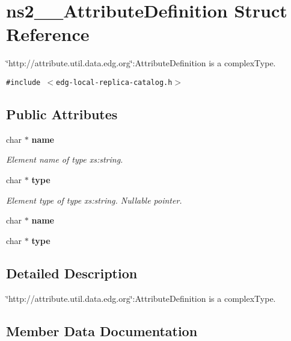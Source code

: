 \section{ns2\_\-\_\-Attribute\-Definition Struct Reference}
\label{structns2____AttributeDefinition}
\char`\"{}http://attribute.util.data.edg.org\char`\"{}:Attribute\-Definition is a complex\-Type.  


{\tt \#include $<$edg-local-replica-catalog.h$>$}

\subsection*{Public Attributes}
\begin{CompactItemize}
\item 
char $\ast$ \bf{name}
\begin{CompactList}\small\item\em Element name of type xs:string. \item\end{CompactList}\item 
char $\ast$ \bf{type}\label{structns2____AttributeDefinition_bc7101ac4ff1f50cd0c0fcf6775ab6b4}

\begin{CompactList}\small\item\em Element type of type xs:string. Nullable pointer. \item\end{CompactList}\item 
char $\ast$ \textbf{name}\label{structns2____AttributeDefinition_8f8f5e508f0c5687519da332357f3bf5}

\item 
char $\ast$ \textbf{type}\label{structns2____AttributeDefinition_bc7101ac4ff1f50cd0c0fcf6775ab6b4}

\end{CompactItemize}


\subsection{Detailed Description}
\char`\"{}http://attribute.util.data.edg.org\char`\"{}:Attribute\-Definition is a complex\-Type. 



\subsection{Member Data Documentation}
